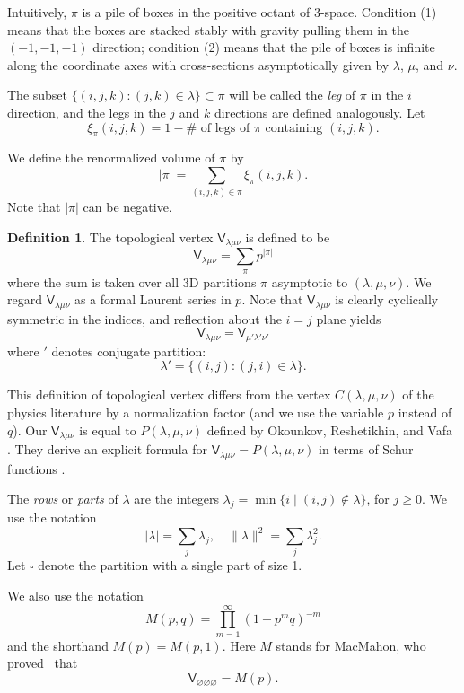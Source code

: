 \documentclass[12pt]{amsart}
\newcommand{\Vsf}{\mathsf{V}}
\newcommand{\bx}{\square}
\renewcommand{\emptyset}{\varnothing}
\theoremstyle{definition}
\newtheorem{defn}[theorem]{Definition}
\begin{document}
Intuitively, $\pi $ is a pile of boxes in the positive octant of
3-space.  Condition (1) means that the boxes are stacked stably with
gravity pulling them in the $(-1,-1,-1)$ direction; condition (2)
means that the pile of boxes is infinite along the coordinate axes
with cross-sections asymptotically given by $\lambda $, $\mu $, and
$\nu $.

The subset $\{(i,j,k ): (j,k)\in \lambda \}\subset \pi $ will be
called the \emph{leg} of $\pi $ in the $i$ direction, and the legs in
the $j$ and $k$ directions are defined analogously. Let
\begin{equation*}
\xi _{\pi } (i,j,k) = 1 - \# \text{ of legs of $\pi $ containing }
(i,j,k) .
\end{equation*}

We define the renormalized volume of $\pi $ by
\[
|\pi | = \sum _{(i,j,k)\in \pi } \xi _{\pi } (i,j,k).
\]
Note that $|\pi |$ can be negative.
\begin{defn}\label{defn: box counting vertex}
The topological vertex $\Vsf_{\lambda \mu \nu }$ is defined to be
\[
\Vsf _{\lambda \mu \nu }= \sum _{\pi } p^{|\pi |}
\]
where the sum is taken over all 3D partitions $\pi $ asymptotic to
$(\lambda ,\mu ,\nu )$. We regard $\Vsf _{\lambda \mu \nu }$ as a
formal Laurent series in $p$. Note that $\Vsf _{\lambda \mu \nu }$ is
clearly cyclically symmetric in the indices, and reflection about the
$i=j$ plane yields
\[
\Vsf _{\lambda \mu \nu } = \Vsf _{\mu '\lambda '\nu '}
\]
where $'$ denotes conjugate partition:
\[
\lambda ' = \{(i,j): (j,i)\in \lambda  \}.
\]

\end{defn}
This definition of topological vertex differs from the vertex $C
(\lambda ,\mu ,\nu )$ of the physics literature by a normalization
factor (and we use the variable $p$ instead of $q$). Our $\Vsf
_{\lambda \mu \nu }$ is equal to $P (\lambda ,\mu ,\nu )$ defined by
Okounkov, Reshetikhin, and Vafa \cite[eqn~3.16]{Ok-Re-Va}. They derive
an explicit formula for $\Vsf _{\lambda \mu \nu }=P (\lambda, \mu, \nu
)$ in terms of Schur functions \cite[eqns~3.20 and 3.21]{Ok-Re-Va}.



The \emph{rows} or \emph{parts} of $\lambda $
are the integers $\lambda _j = \min \{i \;|\;(i,j) \not \in \lambda
\}$, for $j \geq 0$. We use the notation
\[
|\lambda | = \sum_{j} \lambda_{j},\quad \| \lambda \| ^{2} =\sum_{j}\lambda_{j}^{2}.
\]
Let $\bx$ denote the partition with a single part of size 1.

We also use the notation
\[
M(p,q) = \prod_{m=1}^{\infty} (1-p^{m}q)^{-m}
\]
and the shorthand $M(p)=M(p,1)$.  Here $M$ stands for MacMahon, who
proved~\cite{macmahon} that 
\[
\Vsf_{\emptyset \emptyset \emptyset} =M(p).
\]
\end{document}
